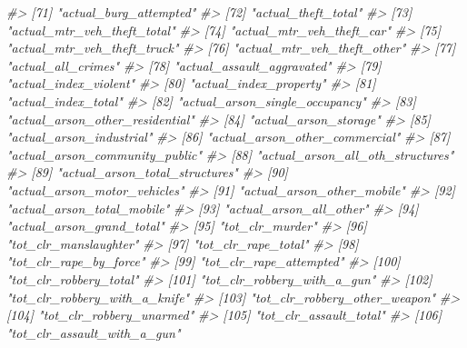 \documentclass[
]{krantz}
\makeatletter
\newenvironment{Shaded}{\begin{snugshade}}{\end{snugshade}}
\newcommand{\CommentTok}[1]{\textcolor[rgb]{0.37,0.37,0.37}{\textit{#1}}}
\newenvironment{kframe}{%
\medskip{}
\setlength{\fboxsep}{.8em}
 \def\at@end@of@kframe{}%
 \ifinner\ifhmode%
  \def\at@end@of@kframe{\end{minipage}}%
  \begin{minipage}{\columnwidth}%
 \fi\fi%
 \def\FrameCommand##1{\hskip\@totalleftmargin \hskip-\fboxsep
 \colorbox{shadecolor}{##1}\hskip-\fboxsep
     \hskip-\linewidth \hskip-\@totalleftmargin \hskip\columnwidth}%
 \MakeFramed {\advance\hsize-\width
   \@totalleftmargin\z@ \linewidth\hsize
   \@setminipage}}%
 {\par\unskip\endMakeFramed%
 \at@end@of@kframe}
\renewenvironment{Shaded}{\begin{kframe}}{\end{kframe}}
\makeatother
\begin{document}
\begin{Shaded}
\begin{Highlighting}[]
\CommentTok{\#\textgreater{}  [71] "actual\_burg\_attempted"           }
\CommentTok{\#\textgreater{}  [72] "actual\_theft\_total"              }
\CommentTok{\#\textgreater{}  [73] "actual\_mtr\_veh\_theft\_total"      }
\CommentTok{\#\textgreater{}  [74] "actual\_mtr\_veh\_theft\_car"        }
\CommentTok{\#\textgreater{}  [75] "actual\_mtr\_veh\_theft\_truck"      }
\CommentTok{\#\textgreater{}  [76] "actual\_mtr\_veh\_theft\_other"      }
\CommentTok{\#\textgreater{}  [77] "actual\_all\_crimes"               }
\CommentTok{\#\textgreater{}  [78] "actual\_assault\_aggravated"       }
\CommentTok{\#\textgreater{}  [79] "actual\_index\_violent"            }
\CommentTok{\#\textgreater{}  [80] "actual\_index\_property"           }
\CommentTok{\#\textgreater{}  [81] "actual\_index\_total"              }
\CommentTok{\#\textgreater{}  [82] "actual\_arson\_single\_occupancy"   }
\CommentTok{\#\textgreater{}  [83] "actual\_arson\_other\_residential"  }
\CommentTok{\#\textgreater{}  [84] "actual\_arson\_storage"            }
\CommentTok{\#\textgreater{}  [85] "actual\_arson\_industrial"         }
\CommentTok{\#\textgreater{}  [86] "actual\_arson\_other\_commercial"   }
\CommentTok{\#\textgreater{}  [87] "actual\_arson\_community\_public"   }
\CommentTok{\#\textgreater{}  [88] "actual\_arson\_all\_oth\_structures" }
\CommentTok{\#\textgreater{}  [89] "actual\_arson\_total\_structures"   }
\CommentTok{\#\textgreater{}  [90] "actual\_arson\_motor\_vehicles"     }
\CommentTok{\#\textgreater{}  [91] "actual\_arson\_other\_mobile"       }
\CommentTok{\#\textgreater{}  [92] "actual\_arson\_total\_mobile"       }
\CommentTok{\#\textgreater{}  [93] "actual\_arson\_all\_other"          }
\CommentTok{\#\textgreater{}  [94] "actual\_arson\_grand\_total"        }
\CommentTok{\#\textgreater{}  [95] "tot\_clr\_murder"                  }
\CommentTok{\#\textgreater{}  [96] "tot\_clr\_manslaughter"            }
\CommentTok{\#\textgreater{}  [97] "tot\_clr\_rape\_total"              }
\CommentTok{\#\textgreater{}  [98] "tot\_clr\_rape\_by\_force"           }
\CommentTok{\#\textgreater{}  [99] "tot\_clr\_rape\_attempted"          }
\CommentTok{\#\textgreater{} [100] "tot\_clr\_robbery\_total"           }
\CommentTok{\#\textgreater{} [101] "tot\_clr\_robbery\_with\_a\_gun"      }
\CommentTok{\#\textgreater{} [102] "tot\_clr\_robbery\_with\_a\_knife"    }
\CommentTok{\#\textgreater{} [103] "tot\_clr\_robbery\_other\_weapon"    }
\CommentTok{\#\textgreater{} [104] "tot\_clr\_robbery\_unarmed"         }
\CommentTok{\#\textgreater{} [105] "tot\_clr\_assault\_total"           }
\CommentTok{\#\textgreater{} [106] "tot\_clr\_assault\_with\_a\_gun"      }

\end{Highlighting}
\end{Shaded}
\end{document}
